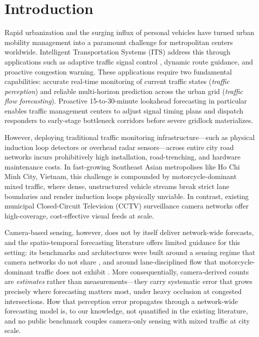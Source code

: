 \documentclass[preprint,12pt]{elsarticle}
\begin{document}


\section{Introduction}
\label{sec:intro}

Rapid urbanization and the surging influx of personal vehicles have turned urban mobility management into a paramount challenge for metropolitan centers worldwide. Intelligent Transportation Systems (ITS) address this through applications such as adaptive traffic signal control \citep{signal_control}, dynamic route guidance, and proactive congestion warning. These applications require two fundamental capabilities: accurate real-time monitoring of current traffic states (\emph{traffic perception}) and reliable multi-horizon prediction across the urban grid (\emph{traffic flow forecasting}). Proactive 15-to-30-minute lookahead forecasting in particular enables traffic management centers to adjust signal timing plans and dispatch responders to early-stage bottleneck corridors before severe gridlock materializes.

However, deploying traditional traffic monitoring infrastructure---such as physical induction loop detectors or overhead radar sensors---across entire city road networks incurs prohibitively high installation, road-trenching, and hardware maintenance costs. In fast-growing Southeast Asian metropolises like Ho Chi Minh City, Vietnam, this challenge is compounded by motorcycle-dominant mixed traffic, where dense, unstructured vehicle streams break strict lane boundaries and render induction loops physically unviable. In contrast, existing municipal Closed-Circuit Television (CCTV) surveillance camera networks offer high-coverage, cost-effective visual feeds at scale.


Camera-based sensing, however, does not by itself deliver network-wide forecasts, and the spatio-temporal forecasting literature offers limited guidance for this setting: its benchmarks and architectures were built around a sensing regime that camera networks do not share \citep{dcrnn, stgcn}, and around lane-disciplined flow that motorcycle-dominant traffic does not exhibit \citep{cao2007, lee2009}. More consequentially, camera-derived counts are \emph{estimates} rather than measurements---they carry systematic error that grows precisely where forecasting matters most, under heavy occlusion at congested intersections. How that perception error propagates through a network-wide forecasting model is, to our knowledge, not quantified in the existing literature, and no public benchmark couples camera-only sensing with mixed traffic at city scale.
\end{document}
